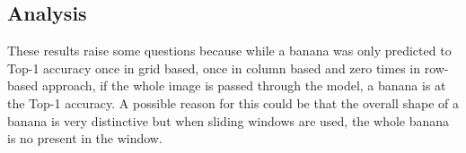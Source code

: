 \tocless\subsection{Analysis}
These results raise some questions because while a banana was only predicted to
Top-1 accuracy once in grid based, once in column based and zero times in row-based approach, if the whole image is passed through the model, a banana is at the Top-1 accuracy.
A possible reason for this could be that the overall shape of a banana is very distinctive but when sliding windows are used, the whole banana is no present in the window.

\afterpage{\clearpage}






















